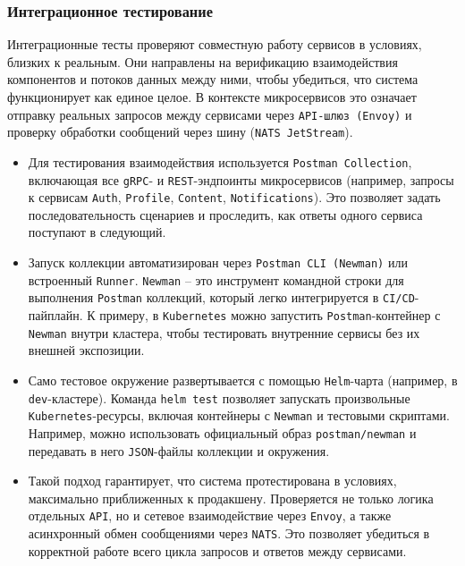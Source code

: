 \subsubsection*{Интеграционное тестирование}
Интеграционные тесты проверяют совместную работу сервисов в условиях, близких к реальным. Они направлены на верификацию взаимодействия компонентов и потоков данных между ними, чтобы убедиться, что система функционирует как единое целое. В контексте микросервисов это означает отправку реальных запросов между сервисами через \texttt{API-шлюз (Envoy)} и проверку обработки сообщений через шину (\texttt{NATS JetStream}).
\begin{itemize}
    \item Для тестирования взаимодействия используется \texttt{Postman Collection}, включающая все \texttt{gRPC}- и \texttt{REST}-эндпоинты микросервисов (например, запросы к сервисам \texttt{Auth}, \texttt{Profile}, \texttt{Content}, \texttt{Notifications}). Это позволяет задать последовательность сценариев и проследить, как ответы одного сервиса поступают в следующий.
    \item Запуск коллекции автоматизирован через \texttt{Postman CLI (Newman)} или встроенный \texttt{Runner}. \texttt{Newman} – это инструмент командной строки для выполнения \texttt{Postman} коллекций, который легко интегрируется в \texttt{CI/CD}-пайплайн. К примеру, в \texttt{Kubernetes} можно запустить \texttt{Postman}-контейнер с \texttt{Newman} внутри кластера, чтобы тестировать внутренние сервисы без их внешней экспозиции.
    \item Само тестовое окружение развертывается с помощью \texttt{Helm}-чарта (например, в \texttt{dev}-кластере). Команда \texttt{helm test} позволяет запускать произвольные \texttt{Kubernetes}-ресурсы, включая контейнеры с \texttt{Newman} и тестовыми скриптами. Например, можно использовать официальный образ \texttt{postman/newman} и передавать в него \texttt{JSON}-файлы коллекции и окружения.
    \item Такой подход гарантирует, что система протестирована в условиях, максимально приближенных к продакшену. Проверяется не только логика отдельных \texttt{API}, но и сетевое взаимодействие через \texttt{Envoy}, а также асинхронный обмен сообщениями через \texttt{NATS}. Это позволяет убедиться в корректной работе всего цикла запросов и ответов между сервисами.
\end{itemize}


